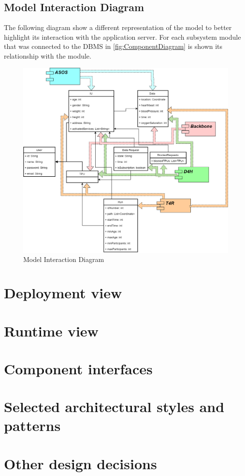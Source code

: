 \subsection{Model Interaction Diagram}
The following diagram show a different representation of the model to better highlight its interaction with the application server. For each subsystem module that was connected to the DBMS in \ref{fig:ComponentDiagram} is shown its relationship with the module. 
\begin{figure}[H]
\caption{Model Interaction Diagram}
\centering
\includegraphics[width = \textwidth]{sections/architecturalDesign/modelInteractionDiagram.png}
\end{figure}
\clearpage
\section{Deployment view}
\section{Runtime view}
\section{Component interfaces}
\section{Selected architectural styles and patterns}
\section{Other design decisions}
